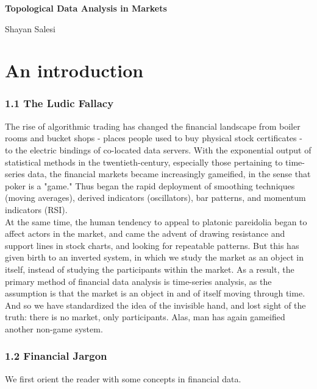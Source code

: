 \documentclass[14pt]{extarticle}
\begin{document}
	\begin{center}
		\textbf{\Large Topological Data Analysis in Markets}
	\end{center}
	\begin{center}
		Shayan Salesi
	\end{center}

\part{An introduction}
	
\section*{1.1 The Ludic Fallacy}
	
The rise of algorithmic trading has changed the financial landscape 
from boiler rooms and bucket shops - places people used to buy
physical stock certificates - to the electric bindings of co-located
data servers. With the exponential output of statistical methods in the twentieth-century, especially those pertaining to time-series data, the financial markets became increasingly gameified, in the sense that poker is a "game." Thus began the rapid deployment of smoothing techniques (moving averages), derived indicators (oscillators), bar patterns, and momentum indicators (RSI). \\

At the same time, the human tendency to appeal to platonic pareidolia began to affect actors in the market, and came the advent of drawing resistance and support lines in stock charts, and looking for repeatable patterns. But this has given birth to an inverted system, in which we study the market as an object in itself, instead of studying the participants within the market. As a result, the primary method of financial data analysis is time-series analysis, as the assumption is that the market is an object in and of itself moving through time. \\

And so we have standardized the idea of the invisible hand, and lost sight of the truth: there is no market, only participants. Alas, man has again gameified another non-game system.
	
\section*{1.2 Financial Jargon}
We first orient the reader with some concepts in financial data. \\
\end{document}
